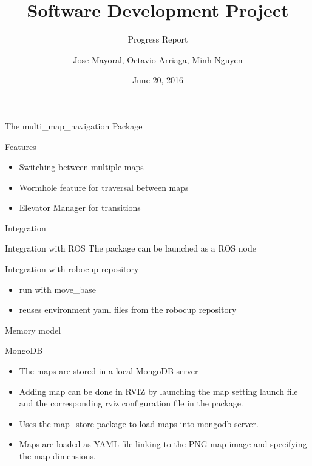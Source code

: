 \documentclass[14pt]{beamer}
\title{Software Development Project}
\subtitle{Progress Report}
\date{June 20, 2016}
\author{Jose Mayoral, Octavio Arriaga, Minh Nguyen}
\begin{document}
\maketitle

\begin{frame}{The multi\_map\_navigation Package}
    \begin{alertblock}{Features}
        \begin{itemize}
            \item Switching between multiple maps
            \item Wormhole feature for traversal between maps
            \item Elevator Manager for transitions
        \end{itemize}
    \end{alertblock}
\end{frame}

\begin{frame}{Integration}
    \begin{alertblock}{Integration with ROS}
        The package can be launched as a ROS node
    \end{alertblock}
    \begin{alertblock}{Integration with robocup repository}
    \begin{itemize}
        \item run with move\_base
        \item reuses environment yaml files from the robocup repository
    \end{itemize}
    \end{alertblock}
\end{frame}

\begin{frame}{Memory model}
    \begin{alertblock}{MongoDB}
        \begin{itemize}
            \item The maps are stored in a local MongoDB server
            \item Adding map can be done in RVIZ by launching the map setting launch file and the corresponding rviz configuration file in the package.
            \item Uses the map\_store package to load maps into mongodb server.
            \item Maps are loaded as YAML file linking to the PNG map image and specifying the map dimensions.
        \end{itemize}
    \end{alertblock}
\end{frame}
\end{document}
